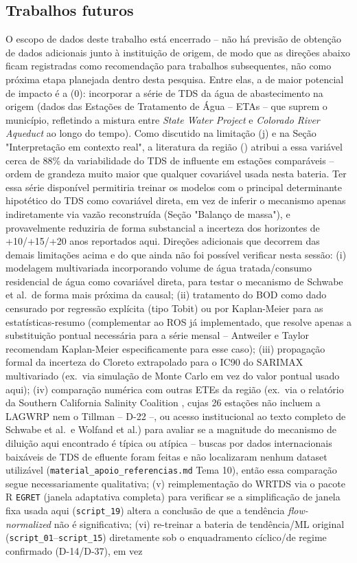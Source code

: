\subsection{Trabalhos futuros}

O escopo de dados deste trabalho está encerrado -- não há previsão de obtenção de dados adicionais junto à instituição de origem, de modo que as direções abaixo ficam registradas como recomendação para trabalhos subsequentes, não como próxima etapa planejada dentro desta pesquisa. Entre elas, a de maior potencial de impacto é a (0): incorporar a série de TDS da água de abastecimento na origem (dados das Estações de Tratamento de Água -- ETAs -- que suprem o município, refletindo a mistura entre \textit{State Water Project} e \textit{Colorado River Aqueduct} ao longo do tempo). Como discutido na limitação (j) e na Seção "Interpretação em contexto real", a literatura da região (\cite{scsc2018tds}) atribui a essa variável cerca de 88\% da variabilidade do TDS de influente em estações comparáveis -- ordem de grandeza muito maior que qualquer covariável usada nesta bateria. Ter essa série disponível permitiria treinar os modelos com o principal determinante hipotético do TDS como covariável direta, em vez de inferir o mecanismo apenas indiretamente via vazão reconstruída (Seção "Balanço de massa"), e provavelmente reduziria de forma substancial a incerteza dos horizontes de +10/+15/+20 anos reportados aqui. Direções adicionais que decorrem das demais limitações acima e do que ainda não foi possível verificar nesta sessão: (i) modelagem multivariada incorporando volume de água tratada/consumo residencial de água como covariável direta, para testar o mecanismo de Schwabe et al.\ de forma mais próxima da causal; (ii) tratamento do BOD como dado censurado por regressão explícita (tipo Tobit) ou por Kaplan-Meier para as estatísticas-resumo (complementar ao ROS já implementado, que resolve apenas a substituição pontual necessária para a série mensal -- Antweiler e Taylor \cite{antweiler2008evaluation} recomendam Kaplan-Meier especificamente para esse caso); (iii) propagação formal da incerteza do Cloreto extrapolado para o IC90 do SARIMAX multivariado (ex.\ via simulação de Monte Carlo em vez do valor pontual usado aqui); (iv) comparação numérica com outras ETEs da região (ex.\ via o relatório da Southern California Salinity Coalition \cite{scsc2018tds}, cujas 26 estações não incluem a LAGWRP nem o Tillman -- D-22 --, ou acesso institucional ao texto completo de Schwabe et al.\ e Wolfand et al.) para avaliar se a magnitude do mecanismo de diluição aqui encontrado é típica ou atípica -- buscas por dados internacionais baixáveis de TDS de efluente foram feitas e não localizaram nenhum dataset utilizável (\texttt{material\_apoio\_referencias.md} Tema 10), então essa comparação segue necessariamente qualitativa; (v) reimplementação do WRTDS via o pacote R \texttt{EGRET} (janela adaptativa completa) para verificar se a simplificação de janela fixa usada aqui (\texttt{script\_19}) altera a conclusão de que a tendência \textit{flow-normalized} não é significativa; (vi) re-treinar a bateria de tendência/ML original (\texttt{script\_01}--\texttt{script\_15}) diretamente sob o enquadramento cíclico/de regime confirmado (D-14/D-37), em vez 